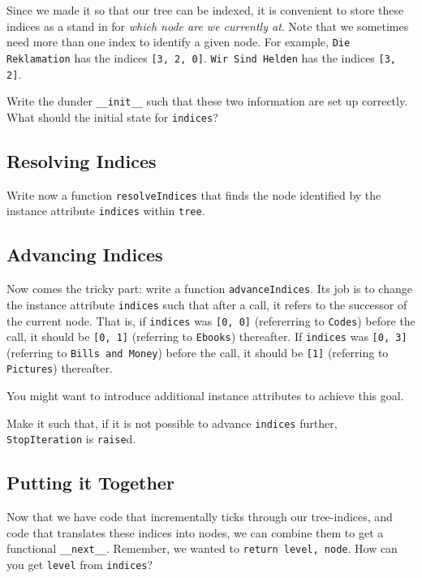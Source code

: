 \documentclass[
	english,
	fontsize=10pt,
	parskip=half,
	titlepage=true,
	DIV=12
]{scrartcl}
\newcommand*{\inPy}[1]{\texttt{#1}}
\begin{document}
Since we made it so that our tree can be indexed, it is convenient to store these indices as a stand in for \emph{which node are we currently at}. Note that we sometimes need more than one index to identify a given node. For example, \texttt{Die Reklamation} has the indices \texttt{[3, 2, 0]}. \texttt{Wir Sind Helden} has the indices \texttt{[3, 2]}.

Write the dunder \inPy{__init__} such that these two information are set up correctly. What should the initial state for \texttt{indices}?

\subsection{Resolving Indices}
Write now a function \texttt{resolveIndices} that finds the node identified by the instance attribute \texttt{indices} within \texttt{tree}.

\subsection{Advancing Indices}
Now comes the tricky part: write a function \texttt{advanceIndices}. Its job is to change the instance attribute \texttt{indices} such that after a call, it refers to the successor of the current node. That is, if \texttt{indices} was \texttt{[0, 0]} (refererring to \texttt{Codes}) before the call, it should be \texttt{[0, 1]} (referring to \texttt{Ebooks}) thereafter. If \texttt{indices} was \texttt{[0, 3]} (referring to \texttt{Bills and Money}) before the call, it should be \texttt{[1]} (referring to \texttt{Pictures}) thereafter.

You might want to introduce additional instance attributes to achieve this goal.

Make it such that, if it is not possible to advance \texttt{indices} further, \inPy{StopIteration} is \inPy{raise}d.

\subsection{Putting it Together}
Now that we have code that incrementally ticks through our tree-indices, and code that translates these indices into nodes, we can combine them to get a functional \inPy{__next__}. Remember, we wanted to \inPy{return level, node}. How can you get \texttt{level} from \texttt{indices}?
\end{document}
